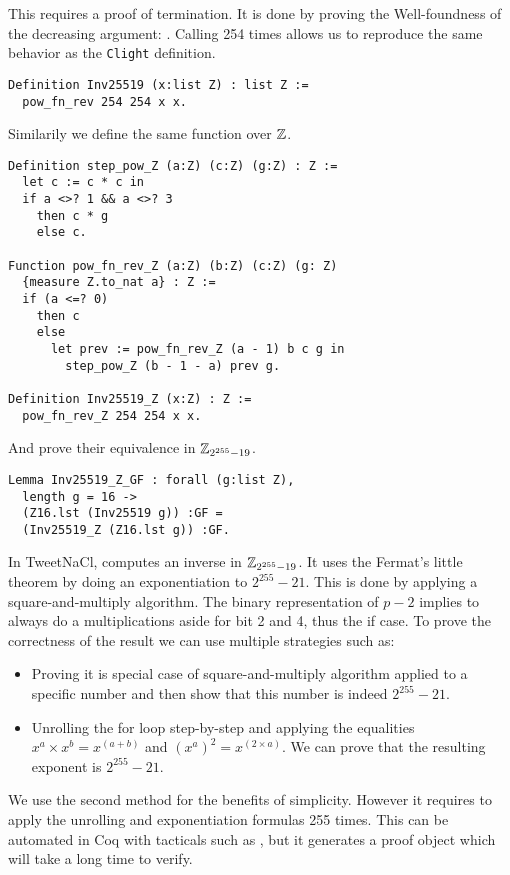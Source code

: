 This  requires a proof of termination. It is done by proving the
Well-foundness of the decreasing argument: . Calling
 254 times allows us to reproduce the same behavior as the \texttt{Clight} definition.
\begin{lstlisting}[language=Coq]
Definition Inv25519 (x:list Z) : list Z :=
  pow_fn_rev 254 254 x x.
\end{lstlisting}
Similarily we define the same function over $\mathbb{Z}$.
\begin{lstlisting}[language=Coq]
Definition step_pow_Z (a:Z) (c:Z) (g:Z) : Z :=
  let c := c * c in
  if a <>? 1 && a <>? 3
    then c * g
    else c.

Function pow_fn_rev_Z (a:Z) (b:Z) (c:Z) (g: Z)
  {measure Z.to_nat a} : Z :=
  if (a <=? 0)
    then c
    else
      let prev := pow_fn_rev_Z (a - 1) b c g in
        step_pow_Z (b - 1 - a) prev g.

Definition Inv25519_Z (x:Z) : Z :=
  pow_fn_rev_Z 254 254 x x.
\end{lstlisting}
And prove their equivalence in $\mathbb{Z}_{2^{255}-19}$.
\begin{lstlisting}[language=Coq]
Lemma Inv25519_Z_GF : forall (g:list Z),
  length g = 16 ->
  (Z16.lst (Inv25519 g)) :GF =
  (Inv25519_Z (Z16.lst g)) :GF.
\end{lstlisting}
In TweetNaCl,  computes an inverse in $\mathbb{Z}_{2^{255}-19}$. It uses the
Fermat's little theorem by doing an exponentiation to $2^{255}-21$.
This is done by applying a square-and-multiply algorithm. The binary representation
of $p-2$ implies to always do a multiplications aside for bit 2 and 4, thus the if case.
To prove the correctness of the result we can use multiple strategies such as:
\begin{itemize}
  \item Proving it is special case of square-and-multiply algorithm applied to
  a specific number and then show that this number is indeed $2^{255}-21$.
  \item Unrolling the for loop step-by-step and applying the equalities
  $x^a \times x^b = x^{(a+b)}$ and $(x^a)^2 = x^{(2 \times a)}$. We can prove that
  the resulting exponent is $2^{255}-21$.
\end{itemize}
We use the second method for the benefits of simplicity. However it requires to
apply the unrolling and exponentiation formulas 255 times. This can be automated
in Coq with tacticals such as , but it generates a proof object which
will take a long time to verify.


